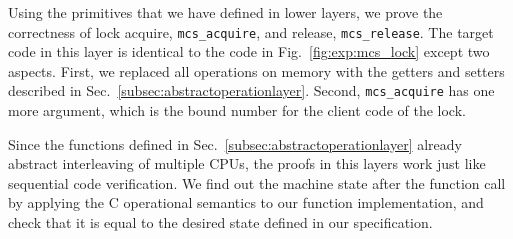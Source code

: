 Using the primitives that we have defined in lower layers, we prove the correctness of lock acquire, \lstinline$mcs_acquire$, and release, \lstinline$mcs_release$.
The target code in this layer is identical to the code in Fig.~\ref{fig:exp:mcs_lock} except two aspects. 
First, we replaced all operations on memory with the getters and setters described in Sec.~\ref{subsec:abstractoperationlayer}.
Second, \lstinline$mcs_acquire$ has one more
 argument, which is the bound number for the client code of the lock.

Since the functions defined in
Sec.~\ref{subsec:abstractoperationlayer} already abstract interleaving
of multiple CPUs, the proofs in this layers work just like sequential
code verification. We find out the machine state after the function
call by applying the C operational semantics to our function
implementation, and check that it is equal to the desired state
defined in our specification.

